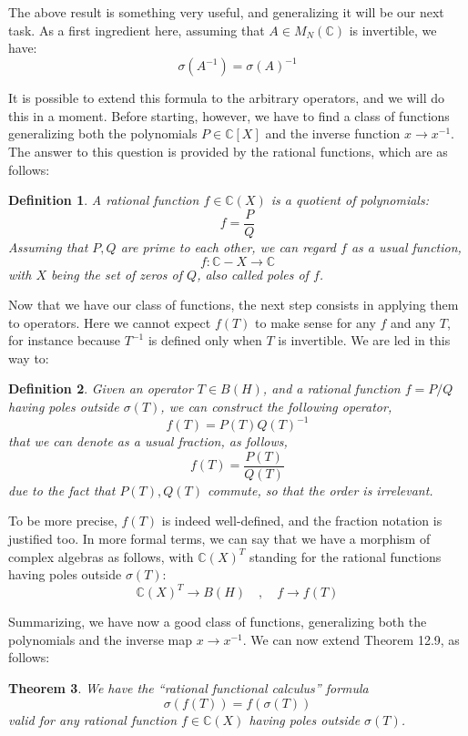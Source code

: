 \documentclass[12pt]{amsbook}
\newtheorem{theorem}{Theorem}[chapter]
\newtheorem{definition}[theorem]{Definition}
\begin{document}
The above result is something very useful, and generalizing it will be our next task. As a first ingredient here, assuming that $A\in M_N(\mathbb C)$ is invertible, we have:
$$\sigma(A^{-1})=\sigma(A)^{-1}$$

It is possible to extend this formula to the arbitrary operators, and we will do this in a moment. Before starting, however, we have to find a class of functions generalizing both the polynomials $P\in\mathbb C[X]$ and the inverse function $x\to x^{-1}$. The answer to this question is provided by the rational functions, which are as follows:

\begin{definition}
A rational function $f\in\mathbb C(X)$ is a quotient of polynomials:
$$f=\frac{P}{Q}$$
Assuming that $P,Q$ are prime to each other, we can regard $f$ as a usual function,
$$f:\mathbb C-X\to\mathbb C$$
with $X$ being the set of zeros of $Q$, also called poles of $f$.
\end{definition}

Now that we have our class of functions, the next step consists in applying them to operators. Here we cannot expect $f(T)$ to make sense for any $f$ and any $T$, for instance because $T^{-1}$ is defined only when $T$ is invertible. We are led in this way to:

\begin{definition}
Given an operator $T\in B(H)$, and a rational function $f=P/Q$ having poles outside $\sigma(T)$, we can construct the following operator,
$$f(T)=P(T)Q(T)^{-1}$$
that we can denote as a usual fraction, as follows,
$$f(T)=\frac{P(T)}{Q(T)}$$
due to the fact that $P(T),Q(T)$ commute, so that the order is irrelevant.
\end{definition}

To be more precise, $f(T)$ is indeed well-defined, and the fraction notation is justified too. In more formal terms, we can say that we have a morphism of complex algebras as follows, with $\mathbb C(X)^T$ standing for the rational functions having poles outside $\sigma(T)$:
$$\mathbb C(X)^T\to B(H)\quad,\quad f\to f(T)$$

Summarizing, we have now a good class of functions, generalizing both the polynomials and the inverse map $x\to x^{-1}$. We can now extend Theorem 12.9, as follows:


\begin{theorem}
We have the ``rational functional calculus'' formula
$$\sigma(f(T))=f(\sigma(T))$$
valid for any rational function $f\in\mathbb C(X)$ having poles outside $\sigma(T)$.
\end{theorem}
\end{document}
